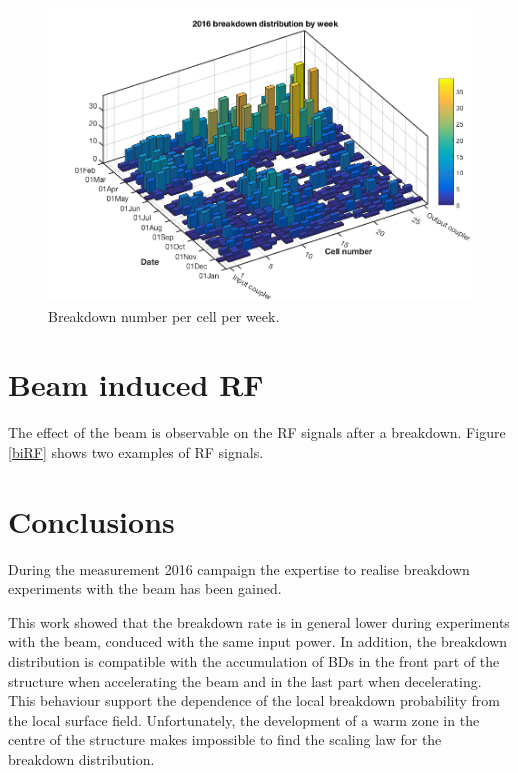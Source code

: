 \begin{figure}[h]
\centering 
\includegraphics[scale=0.4]{pictures/week_distr_3D.png}
\caption{Breakdown number per cell per week. }
\label{BD_prob}
\end{figure}



\section[Beam induced RF]{Beam induced RF}

The effect of the beam is observable on the RF signals after a breakdown. Figure \ref{biRF} shows two examples of RF signals. 




\section{Conclusions}

During the measurement 2016 campaign the expertise to realise breakdown experiments with the beam has been gained. 

This work showed that the breakdown rate is in general lower during experiments with the beam, conduced with the same input power. In addition, the breakdown distribution is compatible with the accumulation of BDs in the front part of the structure when accelerating the beam and in the last part when decelerating. This behaviour support the dependence of the local breakdown probability from the local surface field. Unfortunately, the development of a warm zone in the centre of the structure makes impossible to find the scaling law for the breakdown distribution. 

